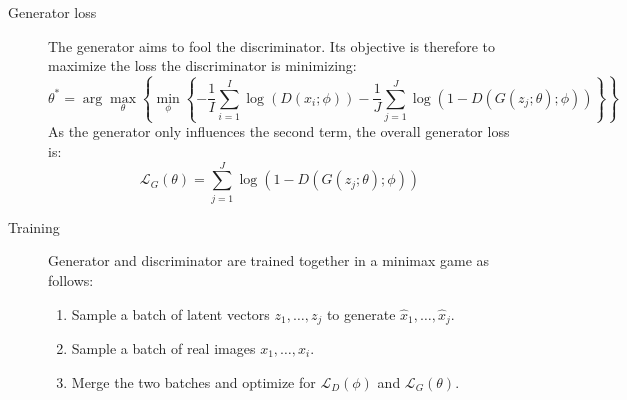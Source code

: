 \begin{description}
\begin{description}
            \item[Generator loss] 
                The generator aims to fool the discriminator. Its objective is therefore to maximize the loss the discriminator is minimizing:
                \[ \theta^* = \arg\max_\theta \left\{ \min_{\phi} \left\{ 
                    -\frac{1}{I} \sum_{i=1}^I \log \left( D(x_i; \phi) \right) - 
                    \frac{1}{J} \sum_{j=1}^J \log \left( 1- D(G(z_j; \theta); \phi) \right) 
                \right\} \right\} \]
                As the generator only influences the second term, the overall generator loss is:
                \[ \mathcal{L}_G(\theta) = \sum_{j=1}^{J} \log\left( 1 - D(G(z_j; \theta); \phi) \right) \]


            \item[Training]
                Generator and discriminator are trained together in a minimax game as follows:
                \begin{enumerate}
                    \item Sample a batch of latent vectors $z_1, \dots, z_j$ to generate $\hat{x}_1, \dots, \hat{x}_j$.
                    \item Sample a batch of real images $x_1, \dots, x_i$.
                    \item Merge the two batches and optimize for $\mathcal{L}_D(\phi)$ and $\mathcal{L}_G(\theta)$.
                \end{enumerate}
        \end{description}


\end{description}
